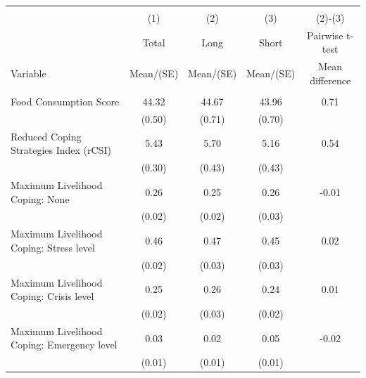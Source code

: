 
\begin{tabular}{@{\extracolsep{5pt}}lcccc}
\\[-1.8ex]\hline \hline \\[-1.8ex]
 & \multicolumn{1}{c}{(1)}  & \multicolumn{1}{c}{(2)}  & \multicolumn{1}{c}{(3)}  & \multicolumn{1}{c}{(2)-(3)} \\
 & \multicolumn{1}{c}{Total}  & \multicolumn{1}{c}{Long}  & \multicolumn{1}{c}{Short}  & \multicolumn{1}{c}{Pairwise t-test}  \\
Variable & Mean/(SE) & Mean/(SE) & Mean/(SE) & Mean difference \\ \hline \\[-1.8ex] 
Food Consumption Score   & 44.32    & 44.67    & 43.96    & 0.71   \\
 & (0.50)  & (0.71)  & (0.70)  &  \\ [1ex]
Reduced Coping Strategies Index (rCSI)   & 5.43    & 5.70    & 5.16    & 0.54   \\
 & (0.30)  & (0.43)  & (0.43)  &  \\ [1ex]
Maximum Livelihood Coping: None   & 0.26    & 0.25    & 0.26    & -0.01   \\
 & (0.02)  & (0.02)  & (0.03)  &  \\ [1ex]
Maximum Livelihood Coping: Stress level   & 0.46    & 0.47    & 0.45    & 0.02   \\
 & (0.02)  & (0.03)  & (0.03)  &  \\ [1ex]
Maximum Livelihood Coping: Crisis level   & 0.25    & 0.26    & 0.24    & 0.01   \\
 & (0.02)  & (0.03)  & (0.02)  &  \\ [1ex]
Maximum Livelihood Coping: Emergency level   & 0.03    & 0.02    & 0.05    & -0.02   \\
 & (0.01)  & (0.01)  & (0.01)  &  \\ [1ex]

\end{tabular}
